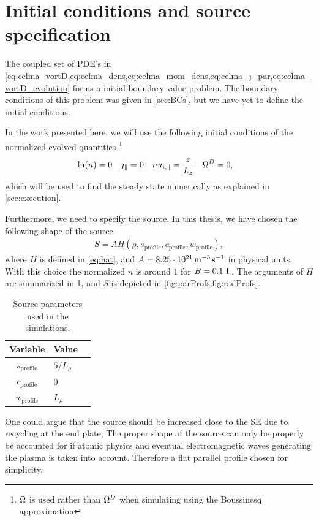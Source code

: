 \section{Initial conditions and source specification}
\label{sec:initRun}
%
The coupled set of PDE's in \cref{eq:celma_vortD,eq:celma_dens,eq:celma_mom_dens,eq:celma_j_par,eq:celma_vortD_evolution} forms a  initial-boundary value problem.
The boundary conditions of this problem was given in \cref{sec:BCs}, but we have yet to define the initial conditions.

In the work presented here, we will use the following initial conditions of the normalized evolved quantities%
%
\footnote{$\Omega$ is used rather than $\Omega^D$ when simulating using the Boussinesq approximation}%
%
\begin{align*}
    &\ln(n)    = 0&
    &j_\|      = 0&
    &nu_{i,\|} = \frac{z}{L_z}&
    &\Omega^D     = 0,&
\end{align*}
%
which will be used to find the steady state numerically as explained in \cref{sec:execution}.

Furthermore, we need to specify the source.
In this thesis, we have chosen the following shape of the source
%
\begin{align*}
    S = AH(\rho,s_{\text{profile}},c_{\text{profile}},w_{\text{profile}}),
\end{align*}
%
where $H$ is defined in \cref{eq:hat}, and $A=8.25\cdot10^{21} \, \text{m}^{-3}\, \text{s}^{-1}$ in physical units.
With this choice the normalized $n$ is around $1$ for $B=0.1\, \text{T}$.
The arguments of $H$ are summarized in \cref{tb:source}, and $S$ is depicted in \cref{fig:parProfs,fig:radProfs}.
%
\begin{table}[!htb]
      \centering
        \caption{Source parameters used in the simulations.}
            \begin{tabular}{c|ll}
            \hline\hline
            Variable & Value \\
            \hline
            $s_{\text{profile}}$ & $5/L_\rho$\\
            $c_{\text{profile}}$ & $0$       \\
            $w_{\text{profile}}$ & $L_\rho$  \\
            \hline\hline
            \end{tabular}
            \label{tb:source}
\end{table}

One could argue that the source should be increased close to the SE due to recycling at the end plate,
The proper shape of the source can only be properly be accounted for if atomic physics and eventual electromagnetic waves generating the plasma is taken into account.
Therefore a flat parallel profile chosen for simplicity.

